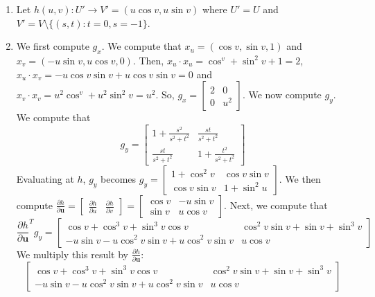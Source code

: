 \documentclass[12pt]{article}
\newcommand{\pderiv}[2][]{\frac{\partial#1}{\partial#2}}
\begin{document}
\begin{enumerate}[label=\Alph*., leftmargin=*]
    \item Let $h(u,v):U'\to V'=(u\cos v, u\sin v)$ where $U'=U$ and $V'=V\setminus\{(s,t):t=0,s=-1\}$.
    \item We first compute $g_x$. We compute that $x_u=(\cos v, \sin v, 1)$ and $x_v=(-u\sin v, u\cos v, 0)$. Then, $x_u\cdot x_u=\cos^ v +\sin^2 v + 1 = 2$, $x_u\cdot x_v=-u\cos v\sin v+u\cos v\sin v = 0$ and
    $x_v\cdot x_v=u^2\cos^ v +u^2\sin^2v=u^2$. So, $g_x=\begin{bmatrix}
        2&0\\
        0&u^2
    \end{bmatrix}$. We now compute $g_y$. We compute that \begin{equation*}
        g_y=\begin{bmatrix}
        1+\frac{s^2}{s^2+t^2}&\frac{st}{s^2+t^2}\\
        \frac{st}{s^2+t^2}&1+\frac{t^2}{s^2+t^2}
    \end{bmatrix}\end{equation*} Evaluating at $h$, $g_y$ becomes $g_y=\begin{bmatrix}
        1+\cos^2 v&\cos v\sin v\\
        \cos v\sin v&1+\sin^2 u
    \end{bmatrix}$. We then compute $\pderiv[h]{\bm{u}}=\begin{bmatrix}
        \pderiv[h]{u}&\pderiv[h]{v}
    \end{bmatrix}=\begin{bmatrix}
        \cos v&-u\sin v\\
        \sin v&u\cos v
    \end{bmatrix}$. Next, we compute that\begin{equation*}
        {\pderiv[h]{\bm{u}}}^{T}g_y=\begin{bmatrix}
            \cos v+\cos^3 v+\sin^3v\cos v&\cos^2v\sin v +\sin v +\sin^3 v\\
            -u\sin v-u\cos^2 v\sin v +u\cos^2v\sin v& u\cos v
        \end{bmatrix}
    \end{equation*} We multiply this result by ${\pderiv[h]{\bm{u}}}$:\begin{equation*}
        \begin{bmatrix}
            \cos v+\cos^3 v+\sin^3v\cos v&\cos^2v\sin v +\sin v +\sin^3 v\\
            -u\sin v-u\cos^2 v\sin v +u\cos^2v\sin v& u\cos v

\end{bmatrix}
\end{equation*}
\end{enumerate}
\end{document}

